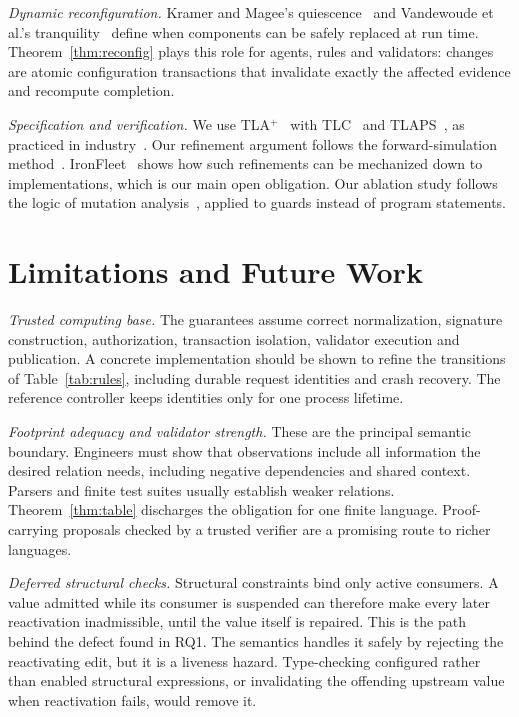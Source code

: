 \documentclass[10pt,journal,compsoc]{IEEEtran}
\theoremstyle{plain}
\theoremstyle{definition}
\begin{document}
\emph{Dynamic reconfiguration.} Kramer and Magee's quiescence~\cite{kramer1990evolving} and Vandewoude et al.'s tranquility~\cite{vandewoude2007tranquility} define when components can be safely replaced at run time. Theorem~\ref{thm:reconfig} plays this role for agents, rules and validators: changes are atomic configuration transactions that invalidate exactly the affected evidence and recompute completion.

\emph{Specification and verification.} We use TLA$^+$~\cite{lamport1994tla,lamport2002specifying} with TLC~\cite{yu1999tlc} and TLAPS~\cite{cousineau2012tlaps}, as practiced in industry~\cite{newcombe2015aws}. Our refinement argument follows the forward-simulation method~\cite{lynch1995simulations,abadi1991refinement}. IronFleet~\cite{ironfleet} shows how such refinements can be mechanized down to implementations, which is our main open obligation. Our ablation study follows the logic of mutation analysis~\cite{jia2011mutation}, applied to guards instead of program statements.

\section{Limitations and Future Work}\label{sec:limitations}
\emph{Trusted computing base.} The guarantees assume correct normalization, signature construction, authorization, transaction isolation, validator execution and publication. A concrete implementation should be shown to refine the transitions of Table~\ref{tab:rules}, including durable request identities and crash recovery. The reference controller keeps identities only for one process lifetime.

\emph{Footprint adequacy and validator strength.} These are the principal semantic boundary. Engineers must show that observations include all information the desired relation needs, including negative dependencies and shared context. Parsers and finite test suites usually establish weaker relations. Theorem~\ref{thm:table} discharges the obligation for one finite language. Proof-carrying proposals checked by a trusted verifier are a promising route to richer languages.

\emph{Deferred structural checks.} Structural constraints bind only active consumers. A value admitted while its consumer is suspended can therefore make every later reactivation inadmissible, until the value itself is repaired. This is the path behind the defect found in RQ1. The semantics handles it safely by rejecting the reactivating edit, but it is a liveness hazard. Type-checking configured rather than enabled structural expressions, or invalidating the offending upstream value when reactivation fails, would remove it.
\end{document}
